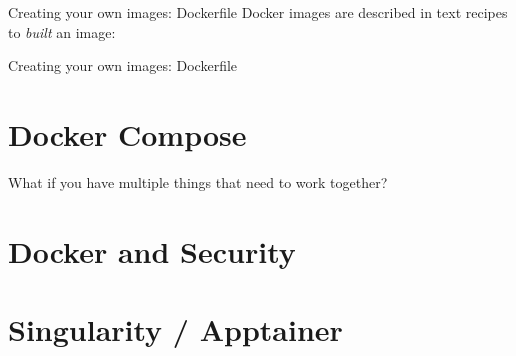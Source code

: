 \documentclass[aspectratio=1610]{beamer}
\begin{document}
\begin{frame}[fragile]{Creating your own images: Dockerfile}
  Docker images are described in text recipes to \emph{built} an image:
\end{frame}

\begin{frame}[fragile]{Creating your own images: Dockerfile}
\end{frame}

\section{Docker Compose}
\begin{frame}{What if you have multiple things that need to work together?}
\end{frame}
\section{Docker and Security}
\section{Singularity / Apptainer}
\end{document}
